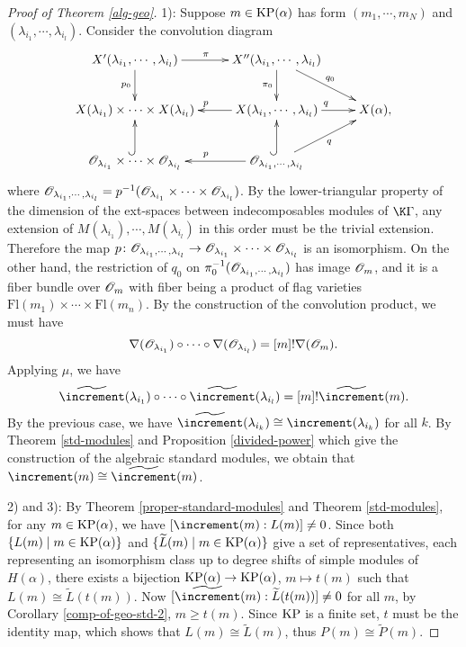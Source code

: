 \begin{proof}[Proof of Theorem \ref{alg-geo}]
    1): Suppose $m\in\operatorname{KP}(\alpha)$ has form $(m_1,\cdots,m_N)$
    and $(\lambda_{i_1},\cdots,
    \lambda_{i_l})$. Consider the convolution diagram 
    \[
    \xymatrix{
        X'(\lambda_{i_1},\cdots,\lambda_{i_l})\ar[d]_{p_0}
        \ar[r]^\pi&
        X''(\lambda_{i_1},\cdots,\lambda_{i_l})\ar[rd]^{q_0}
        \ar[d]_{\pi_0}\\
        X(\lambda_{i_1})\times\cdots\times X(\lambda_{i_l})&
        X(\lambda_{i_1},\cdots,\lambda_{i_l})\ar[l]_{p}
        \ar[r]^{q}&
        X(\alpha),\\
        \OO_{\lambda_{i_1}}\times\cdots\times\OO_{\lambda_{i_l}}
        \ar@{^{(}->}[u]&
        \OO_{\lambda_{i_1},\cdots,\lambda_{i_l}}
        \ar[l]_p\ar@{^{(}->}[u]\ar[ur]_q
    }
    \] 
    where $\mathscr{O}_{\lambda_{i_1},\cdots,\lambda_{i_l}}
     = p^{-1}(\mathscr{O}_{\lambda_{i_1}}\times\cdots\times\mathscr{O}_{\lambda_{i_l}})$.
    By the lower-triangular property
    of the dimension of the ext-spaces between indecomposables modules
    of $\K\Gamma$, any extension of $M(\lambda_{i_1}),
    \cdots,M(\lambda_{i_l})$ in this order must be the trivial extension.
    Therefore the map $p\colon\mathscr{O}_{\lambda_{i_1},\cdots,\lambda_{i_l}}
    \to\mathscr{O}_{\lambda_{i_1}}\times\cdots\times\mathscr{O}_{\lambda_{i_l}}$
    is an isomorphism. On the other hand, the restriction
    of $q_0$ on $\pi_0^{-1}(\mathscr{O}_{\lambda_{i_1},\cdots,\lambda_{i_l}})$
    has image $\mathscr{O}_m$, and it is a fiber bundle over $\mathscr{O}_m$
    with fiber being a product of flag varieties $\mathrm{Fl}(m_1)
    \times\cdots\times\mathrm{Fl}(m_n)$. By the construction of the 
    convolution product, we must have $$\nabla(\mathscr{O}_{\lambda_{i_1}})
    \circ\cdots\circ\nabla(\mathscr{O}_{\lambda_{i_l}}) = [m]!\nabla(\mathscr{O}_m).$$
    Applying $\mu$, we have 
    \[
        \widetilde\std(\lambda_{i_1})
        \circ\cdots\circ\widetilde\std(\lambda_{i_l}) = [m]!\widetilde\std(m).
    \]
    By the previous case, we have $\widetilde\std(\lambda_{i_k})
    \cong\std(\lambda_{i_k})$ for all $k$. By Theorem \ref{std-modules}
    and Proposition \ref{divided-power} which give the construction
    of the algebraic standard modules, we obtain that 
    $\std(m)\cong\widetilde{\std}(m)$.

    2) and 3): By Theorem \ref{proper-standard-modules}
    and Theorem \ref{std-modules}, for any $m\in\operatorname{KP}(\alpha)$, we have
    $[\std(m):L(m)]\ne 0$. Since both $\{L(m)\mid m\in\operatorname{KP}(\alpha)\}$
    and $\{\widetilde{L}(m)\mid m\in\operatorname{KP}(\alpha)\}$ give 
    a set of representatives, each representing an isomorphism class
    up to degree shifts of simple modules of $H(\alpha)$,
    there exists a bijection $\operatorname{KP}(\alpha)\to\operatorname{KP}(\alpha)$,
    $m\mapsto t(m)$ such that $L(m)\cong\widetilde{L}(t(m))$.
    Now $[\widetilde{\std}(m):\widetilde{L}(t(m))]\ne 0$
    for all $m$, by Corollary \ref{comp-of-geo-std-2}, $m\ge t(m)$.
    Since $\operatorname{KP}$ is a finite set, $t$ must be the identity map,
    which shows that $L(m)\cong\widetilde{L}(m)$,
    thus $P(m)\cong\widetilde{P}(m)$.
\end{proof}

